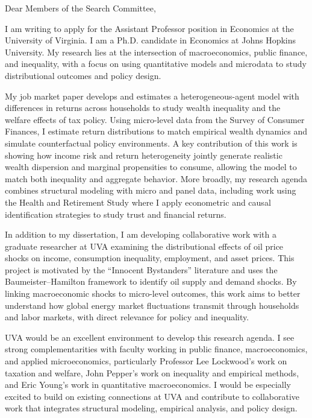 \documentclass[11pt]{letter}
\begin{document}
\begin{letter}{}

\opening{Dear Members of the Search Committee,}

I am writing to apply for the Assistant Professor position in Economics at the University of Virginia. I am a Ph.D. candidate in Economics at Johns Hopkins University. My research lies at the intersection of macroeconomics, public finance, and inequality, with a focus on using quantitative models and microdata to study distributional outcomes and policy design.

My job market paper develops and estimates a heterogeneous-agent model with differences in returns across households to study wealth inequality and the welfare effects of tax policy. Using micro-level data from the Survey of Consumer Finances, I estimate return distributions to match empirical wealth dynamics and simulate counterfactual policy environments. A key contribution of this work is showing how income risk and return heterogeneity jointly generate realistic wealth dispersion and marginal propensities to consume, allowing the model to match both inequality and aggregate behavior. More broadly, my research agenda combines structural modeling with micro and panel data, including work using the Health and Retirement Study where I apply econometric and causal identification strategies to study trust and financial returns.

In addition to my dissertation, I am developing collaborative work with a graduate researcher at UVA examining the distributional effects of oil price shocks on income, consumption inequality, employment, and asset prices. This project is motivated by the ``Innocent Bystanders'' literature and uses the Baumeister--Hamilton framework to identify oil supply and demand shocks. By linking macroeconomic shocks to micro-level outcomes, this work aims to better understand how global energy market fluctuations transmit through households and labor markets, with direct relevance for policy and inequality.

UVA would be an excellent environment to develop this research agenda. I see strong complementarities with faculty working in public finance, macroeconomics, and applied microeconomics, particularly Professor Lee Lockwood’s work on taxation and welfare, John Pepper’s work on inequality and empirical methods, and Eric Young’s work in quantitative macroeconomics. I would be especially excited to build on existing connections at UVA and contribute to collaborative work that integrates structural modeling, empirical analysis, and policy design.


\end{letter}
\end{document}
